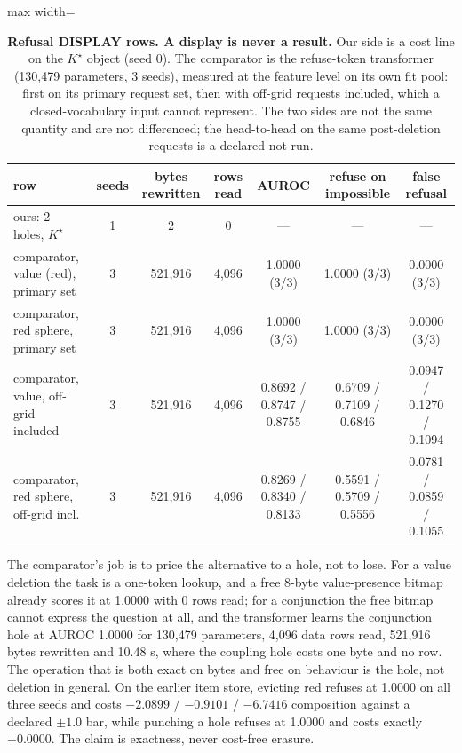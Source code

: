 \documentclass{article} %
\newcommand{\Kstar}{\ensuremath{K^{\star}}}
\begin{document}
\begin{table}[t]
\centering\small
\caption{\textbf{Refusal DISPLAY rows. A display is never a result.} Our side is a cost line
on the $\Kstar$ object (seed 0). The comparator is the refuse-token transformer (130,479
parameters, 3 seeds), measured at the feature level on its own fit pool: first on its primary
request set, then with off-grid requests included, which a closed-vocabulary input cannot
represent. The two sides are not the same quantity and are not differenced; the head-to-head on
the same post-deletion requests is a declared not-run.}
\label{tab:hole}
\setlength{\tabcolsep}{3pt}
\begin{adjustbox}{max width=\linewidth}\begin{tabular}{lcccccc}
\toprule
row & seeds & bytes rewritten & rows read & AUROC & refuse on impossible & false refusal \\
\midrule
ours: 2 holes, $\Kstar$ & 1 & 2 & 0 & --- & --- & --- \\ %
comparator, value (red), primary set & 3 & 521,916 & 4,096 & 1.0000 (3/3) & 1.0000 (3/3) & 0.0000 (3/3) \\
comparator, red sphere, primary set & 3 & 521,916 & 4,096 & 1.0000 (3/3) & 1.0000 (3/3) & 0.0000 (3/3) \\
comparator, value, off-grid included & 3 & 521,916 & 4,096 & 0.8692 / 0.8747 / 0.8755 & 0.6709 / 0.7109 / 0.6846 & 0.0947 / 0.1270 / 0.1094 \\
comparator, red sphere, off-grid incl. & 3 & 521,916 & 4,096 & 0.8269 / 0.8340 / 0.8133 & 0.5591 / 0.5709 / 0.5556 & 0.0781 / 0.0859 / 0.1055 \\
\bottomrule
\end{tabular}\end{adjustbox}
\end{table}

\noindent The comparator's job is to price the alternative to a hole, not to lose. For a value
deletion the task is a one-token lookup, and a free 8-byte value-presence bitmap already scores
it at 1.0000 with 0 rows read; for a conjunction the free bitmap cannot express the question at
all, and the transformer learns the conjunction hole at AUROC 1.0000 for 130,479 parameters,
4,096 data rows read, 521,916 bytes rewritten and 10.48 s, where the coupling hole costs one
byte and no row. %
\noindent The operation that is both exact on bytes and free on behaviour is the hole, not
deletion in general. On the earlier item store, evicting red refuses at 1.0000 on all three
seeds and costs $-2.0899$ / $-0.9101$ / $-6.7416$ composition against a declared $\pm1.0$ bar,
while punching a hole refuses at 1.0000 and costs exactly $+0.0000$. %
The claim is exactness, never cost-free erasure.
\end{document}
